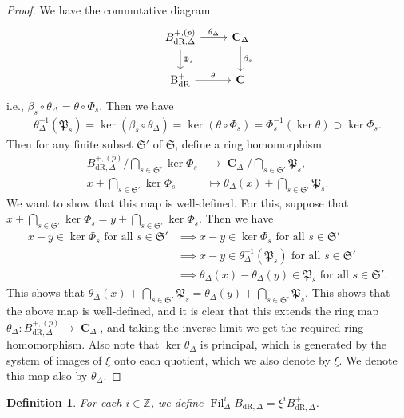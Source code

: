 \documentclass{amsart}
\newtheorem{definition}[proposition]{Definition}
\DeclareMathOperator{\C}{\textbf{C}}
\newcommand{\mBdrp}{B^+_{\mathrm{dR},\Delta}}
\newcommand{\pmBdrp}{B^{+,(p)}_{\mathrm{dR},\Delta}}
\DeclareMathOperator{\Bdrp}{B^+_{dR}}
\newcommand{\mBdr}{B_{\mathrm{dR},\Delta}}
\DeclareMathOperator{\Fil}{Fil}
\begin{document}
\begin{proof}
    We have the commutative diagram
    \[
    \begin{tikzcd}
        \pmBdrp\arrow[r,"\theta_\Delta"]\arrow[d,"\Phi_s"]& \C_\Delta\arrow[d,"\beta_s"]\\
        \Bdrp\arrow[r,"\theta"]  &\C
    \end{tikzcd}
    \]
    i.e., $\beta_s\circ\theta_\Delta=\theta\circ\Phi_s$. Then we have
    \begin{align*}
        \theta^{-1}_\Delta(\mathfrak{P}_s)=\ker(\beta_s\circ\theta_\Delta)=\ker(\theta\circ\Phi_s)=\Phi^{-1}_s(\ker\theta)\supset \ker\Phi_s.
    \end{align*}
    Then for any finite subset $\mathfrak{S}'$ of $\mathfrak{S}$, define a ring homomorphism
    \begin{align*}
        \pmBdrp/\bigcap\limits_{s\in\mathfrak{S}'}\ker\Phi_s&\to \C_\Delta/\bigcap\limits_{s\in\mathfrak{S}'}\mathfrak{P}_s,\\
        x+\bigcap\limits_{s\in\mathfrak{S}'}\ker\Phi_s&\mapsto \theta_\Delta(x)+\bigcap\limits_{s\in\mathfrak{S}'}\mathfrak{P}_s.
    \end{align*}
    We want to show that this map is well-defined. For this, suppose that $x+\bigcap\limits_{s\in\mathfrak{S}'}\ker\Phi_s=y+\bigcap\limits_{s\in\mathfrak{S}'}\ker\Phi_s$. Then we have
    \begin{align*}
        x-y\in\ker\Phi_s\text{ for all }s\in\mathfrak{S}'&\implies x-y\in\ker\Phi_s\text{ for all }s\in\mathfrak{S}'\\
        &\implies x-y\in\theta^{-1}_\Delta(\mathfrak{P}_s)\text{ for all }s\in\mathfrak{S}'\\
        &\implies \theta_\Delta(x)-\theta_\Delta(y)\in\mathfrak{P}_s\text{ for all }s\in\mathfrak{S'}.
    \end{align*}
    This shows that $\theta_\Delta(x)+\bigcap\limits_{s\in\mathfrak{S}'}\mathfrak{P}_s=\theta_\Delta(y)+\bigcap\limits_{s\in\mathfrak{S}'}\mathfrak{P}_s$. This shows that the above map is well-defined, and it is clear that this extends the ring map $\theta_\Delta:\pmBdrp\to\C_\Delta$, and taking the inverse limit we get the required ring homomorphism. Also note that $\ker\theta_\Delta$ is principal, which is generated by the system of images of $\xi$ onto each quotient, which we also denote by $\xi$. We denote this map also by $\theta_\Delta$.
\end{proof}

\begin{definition}
    For each $i\in\mathbb{Z}$, we define $\Fil^i_\Delta\mBdr=\xi^i\mBdrp$.
\end{definition}
\end{document}
